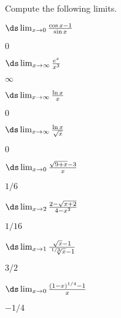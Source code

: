 \begin{enumialphparenastyle}

Compute the following limits.

\begin{ex} 
$\ds\lim_{x\to 0} {\cos x -1\over \sin x}$
\begin{sol}
 $0$
\end{sol}
\end{ex}

\begin{ex} 
$\ds\lim_{x\to \infty} {e^x\over x^3}$
\begin{sol}
 $\infty$
\end{sol}
\end{ex}

\begin{ex} 
$\ds\lim_{x\to \infty} {\ln x\over x}$
\begin{sol}
 $0$
\end{sol}
\end{ex}

\begin{ex} 
$\ds\lim_{x\to \infty} {\ln x\over \sqrt{x}}$
\begin{sol}
 $0$
\end{sol}
\end{ex}

\begin{ex} 
$\ds\lim_{x\to0}{\sqrt{9+x}-3\over x}$
\begin{sol}
 $1/6$
\end{sol}
\end{ex}

\begin{ex} 
$\ds\lim_{x\to2}{2-\sqrt{x+2}\over 4-x^2}$
\begin{sol}
 $1/16$
\end{sol}
\end{ex}

\begin{ex} 
 $\ds\lim_{x\to1}{\sqrt{x}-1\over \root 1/3\of{x}-1}$
\begin{sol}
 $3/2$
\end{sol}
\end{ex}

\begin{ex} 
 $\ds\lim_{x\to0}{(1-x)^{1/4}-1\over x}$
\begin{sol}
 $-1/4$
\end{sol}
\end{ex}


\end{enumialphparenastyle}
